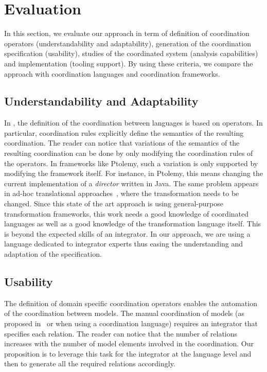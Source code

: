 \section{Evaluation}
\label{sec:evaluation}
In this section, we evaluate our approach in term of definition of coordination operators (\ie understandability and adaptability), generation of the coordination specification (\ie usability), studies of the coordinated system (\ie analysis capabilities) and implementation (\ie tooling support).  By using these criteria, we compare the approach with coordination languages and coordination frameworks.

\subsection{Understandability and Adaptability}
In \bcool, the definition of the coordination between languages is based on operators. In particular, coordination rules explicitly define the semantics of the resulting coordination. The reader can notice that variations of the semantics of the resulting coordination can be done by only modifying the coordination rules of the operators. In frameworks like Ptolemy, such a variation is only supported by modifying the framework itself. For instance, in Ptolemy, this means changing the current implementation of a \emph{director} written in Java. The same problem appears in ad-hoc translational approaches~\cite{dinatale}, where the transformation needs to be changed. Since this state of the art approach is using general-purpose transformation frameworks, this work needs a good knowledge of coordinated languages as well as a good knowledge of the transformation language itself. This is beyond the expected skills of an integrator. In our approach, we are using a language dedicated to integrator experts thus easing the understanding and adaptation of the \bcool specification. 

\subsection{Usability}
The definition of domain specific coordination operators enables the automation of the coordination between models. The manual coordination of models (as proposed in~\cite{varalarsen:gemoc13} or when using a coordination language) requires an integrator that specifies each relation. The reader can notice that the number of relations increases with the number of model elements involved in the coordination. Our proposition is to leverage this task for the integrator at the language level and then to generate all the required relations accordingly.

